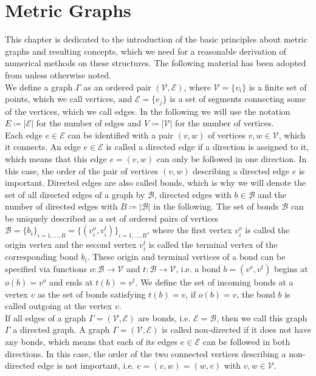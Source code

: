 \section{Metric Graphs}
\label{ch1:sec1}

This chapter is dedicated to the introduction of the basic principles about metric graphs and resulting concepts, which we need for a reasonable derivation of numerical methods on these structures. The following material has been adopted from \cite[chapter~1]{BerkolaikoKuchment:2013} unless otherwise noted. \\

We define a graph $\Gamma$ as an ordered pair $(\mathcal{V}, \mathcal{E})$, where $\mathcal{V} = \{v_i\}$ is a finite set of points, which we call vertices, and $\mathcal{E} = \{e_j\}$ is a set of segments connecting some of the vertices, which we call edges. In the following we will use the notation $E \coloneqq \left\lvert \mathcal{E} \right\rvert$ for the number of edges and $V \coloneqq \left\lvert \mathcal{V} \right\rvert$ for the number of vertices. \\
Each edge $e \in \mathcal{E}$ can be identified with a pair $(v, w)$ of vertices $v, w \in \mathcal{V}$, which it connects. An edge $e \in \mathcal{E}$ is called a directed edge if a direction is assigned to it, which means that this edge $e = (v, w)$ can only be followed in one direction. In this case, the order of the pair of vertices $(v, w)$ describing a directed edge $e$ is important. Directed edges are also called bonds, which is why we will denote the set of all directed edges of a graph by $\mathcal{B}$, directed edges with $b \in \mathcal{B}$ and the number of directed edges with $B \coloneqq \left\lvert \mathcal{B} \right\rvert$ in the following. The set of bonds $\mathcal{B}$ can be uniquely described as a set of ordered pairs of vertices $\mathcal{B} = \{b_i\}_{i = 1, \ldots, B} = \{(v^{o}_{i}, v^{t}_{i})\}_{i = 1, \ldots, B}$, where the first vertex $v^{o}_{i}$ is called the origin vertex and the second vertex $v^{t}_{i}$ is called the terminal vertex of the corresponding bond $b_i$. These origin and terminal vertices of a bond can be specified via functions $o \colon \mathcal{B} \to \mathcal{V}$ and $t \colon \mathcal{B} \to \mathcal{V}$, i.e. a bond $b = (v^{o}, v^{t})$ begins at $o(b) = v^{o}$ and ends at $t(b) = v^{t}$. We define the set of incoming bonds at a vertex $v$ as the set of bonds satisfying $t(b) = v$, if $o(b) = v$, the bond $b$ is called outgoing at the vertex $v$. \\
If all edges of a graph $\Gamma = (\mathcal{V}, \mathcal{E})$ are bonds, i.e. $\mathcal{E} = \mathcal{B}$, then we call this graph $\Gamma$ a directed graph. A graph $\Gamma = (\mathcal{V}, \mathcal{E})$ is called non-directed if it does not have any bonds, which means that each of its edges $e \in \mathcal{E}$ can be followed in both directions. In this case, the order of the two connected vertices describing a non-directed edge is not important, i.e. $e = (v, w) = (w, v)$ with $v, w \in \mathcal{V}$. \\
